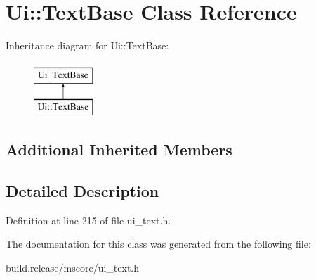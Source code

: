 \hypertarget{class_ui_1_1_text_base}{}\section{Ui\+:\+:Text\+Base Class Reference}
\label{class_ui_1_1_text_base}
Inheritance diagram for Ui\+:\+:Text\+Base\+:\begin{figure}[H]
\begin{center}
\leavevmode
\includegraphics[height=2.000000cm]{class_ui_1_1_text_base}
\end{center}
\end{figure}
\subsection*{Additional Inherited Members}


\subsection{Detailed Description}


Definition at line 215 of file ui\+\_\+text.\+h.



The documentation for this class was generated from the following file\+:\begin{DoxyCompactItemize}
\item 
build.\+release/mscore/ui\+\_\+text.\+h\end{DoxyCompactItemize}
